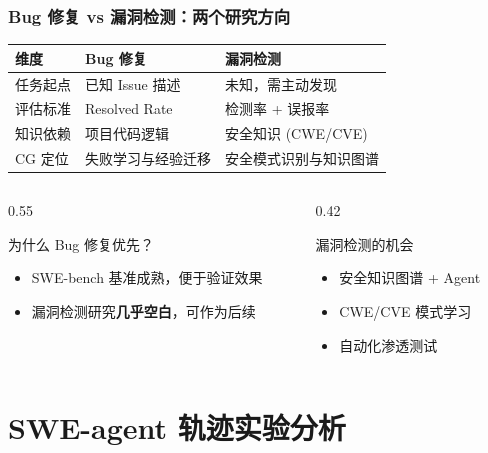 \documentclass[aspectratio=169,10pt]{beamer}
\begin{document}
\begin{frame}
  \frametitle{Bug 修复 vs 漏洞检测：两个研究方向}

  \small
  \begin{tabular}{p{2.2cm}|p{4cm}|p{4cm}}
    \textbf{维度} & \textbf{Bug 修复} & \textbf{漏洞检测} \\
    \hline
    任务起点 & 已知 Issue 描述 & 未知，需主动发现 \\
    评估标准 & Resolved Rate & 检测率 + 误报率 \\
    知识依赖 & 项目代码逻辑 & 安全知识 (CWE/CVE) \\
    CG 定位 & 失败学习与经验迁移 & 安全模式识别与知识图谱 \\
  \end{tabular}

  \vspace{0.3cm}

  \begin{columns}[T]
    \begin{column}{0.55\textwidth}
      \begin{block}{为什么 Bug 修复优先？}
        \begin{itemize}
          \item SWE-bench 基准成熟，便于验证效果
          \item 漏洞检测研究\textbf{几乎空白}，可作为后续
        \end{itemize}
      \end{block}
    \end{column}
    \begin{column}{0.42\textwidth}
      \begin{alertblock}{漏洞检测的机会}
        \begin{itemize}
          \item 安全知识图谱 + Agent
          \item CWE/CVE 模式学习
          \item 自动化渗透测试
        \end{itemize}
      \end{alertblock}
    \end{column}
  \end{columns}
\end{frame}

\section{SWE-agent 轨迹实验分析}
\end{document}
